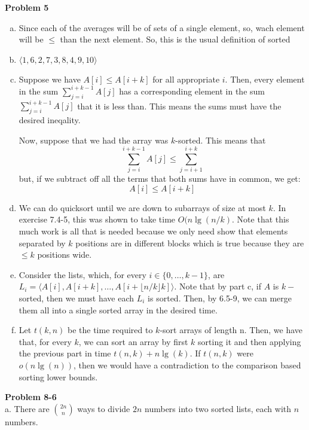 \documentclass{article}
\begin{document}
\noindent\textbf{Problem 5}\\
\begin{enumerate}[a.]
\item
Since each of the averages will be of sets of a single element, so, wach element will be $\le$ than the next element. So, this is the usual definition of sorted
\item
$\langle 1,6,2,7,3,8,4,9,10\rangle$
\item
Suppose we have $A[i] \le A[i+k]$ for all appropriate $i$. Then, every element in the sum $\sum_{j=i}^{i+k-1} A[j]$ has a corresponding element in the sum $\sum_{j=i}^{i+k-1} A[j]$ that it is less than. This means the sums must have the desired ineqality.

Now, suppose that we had the array was $k$-sorted. This means that 
\[
\sum_{j=i}^{i+k-1} A[j] \le \sum_{j=i+1}^{i+k}
\] 
but, if we subtract off all the terms that both sums have in common, we get:
\[
A[i] \le A[i+k]
\]

\item
We can do quicksort until we are down to subarrays of size at most $k$. In exercise 7.4-5, this was shown to take time $O(n\lg(n/k)$. Note that this much work is all that is needed because we only need show that elements separated by $k$ positions are in different blocks which is true because they are $\le k$ positions wide.

\item
Consider the lists, which, for every $i\in\{0,\ldots,k-1\}$, are $L_i = \langle A[i],A[i+k], \ldots,A[i+ \lfloor n/k \rfloor k]\rangle$. Note that by  part c, if $A$ is $k-$ sorted, then we must have each $L_i$ is sorted. Then, by 6.5-9, we can merge them all into a single sorted array in the desired time.

\item
Let $t(k,n)$ be the time required to $k$-sort arrays of length n. Then, we have that, for every $k$, we can sort an array by first $k$ sorting it and then applying the previous part in time $t(n,k) +n \lg(k)$. If $t(n,k)$ were $o(n\lg(n))$, then we would have a contradiction to the comparison based sorting lower bounds.

\end{enumerate}



\noindent\textbf{Problem 8-6}\\

a. There are ${2n \choose n}$ ways to divide $2n$ numbers into two sorted lists, each with $n$ numbers.\\
\end{document}
